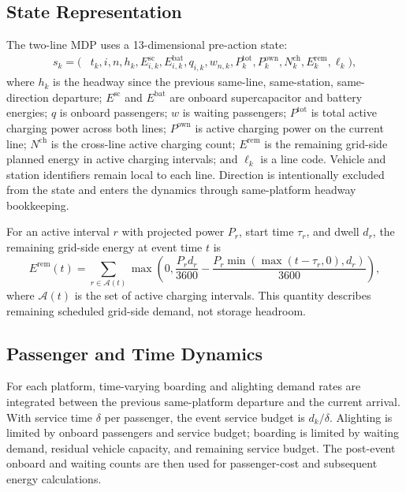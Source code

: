 \documentclass[conference]{IEEEtran}
\begin{document}
\subsection{State Representation}
The two-line MDP uses a 13-dimensional pre-action state:
\begin{align}
 s_k = (&t_k, i, n, h_k, E^{\mathrm{sc}}_{i,k}, E^{\mathrm{bat}}_{i,k}, q_{i,k}, w_{n,k}, 
 P^{\mathrm{tot}}_{k}, P^{\mathrm{own}}_{k}, 
 N^{\mathrm{ch}}_{k}, E^{\mathrm{rem}}_{k}, \ell_k),
\end{align}
where $h_k$ is the headway since the previous same-line, same-station, same-direction departure; $E^{\mathrm{sc}}$ and $E^{\mathrm{bat}}$ are onboard supercapacitor and battery energies; $q$ is onboard passengers; $w$ is waiting passengers; $P^{\mathrm{tot}}$ is total active charging power across both lines; $P^{\mathrm{own}}$ is active charging power on the current line; $N^{\mathrm{ch}}$ is the cross-line active charging count; $E^{\mathrm{rem}}$ is the remaining grid-side planned energy in active charging intervals; and $\ell_k$ is a line code. Vehicle and station identifiers remain local to each line. Direction is intentionally excluded from the state and enters the dynamics through same-platform headway bookkeeping.

For an active interval $r$ with projected power $P_r$, start time $\tau_r$, and dwell $d_r$, the remaining grid-side energy at event time $t$ is
\begin{equation}
 E^{\mathrm{rem}}(t) = \sum_{r \in \mathcal{A}(t)} \max\left(0, \frac{P_r d_r}{3600} - \frac{P_r \min(\max(t-\tau_r,0),d_r)}{3600}\right),
\end{equation}
where $\mathcal{A}(t)$ is the set of active charging intervals. This quantity describes remaining scheduled grid-side demand, not storage headroom.

\subsection{Passenger and Time Dynamics}
For each platform, time-varying boarding and alighting demand rates are integrated between the previous same-platform departure and the current arrival. With service time $\delta$ per passenger, the event service budget is $d_k/\delta$. Alighting is limited by onboard passengers and service budget; boarding is limited by waiting demand, residual vehicle capacity, and remaining service budget. The post-event onboard and waiting counts are then used for passenger-cost and subsequent energy calculations.
\end{document}
